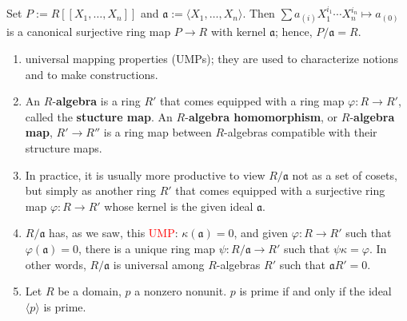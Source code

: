 \documentclass{ctexart}
\newcommand{\ideala}{\mathfrak{a}}
\begin{document}
Set $P:=R[[X_1,\dots,X_n]]$ and $\ideala:=\langle X_1,\dots,X_n\rangle$. Then $\sum a_{(i)}X_1^{i_1}\cdots X_n^{i_n}\mapsto a_{(0)}$ is a canonical surjective ring map $P\to R$ with kernel $\ideala$; hence, $P/\ideala=R$.

\begin{enumerate}
  \item universal mapping properties (UMPs); they are used to characterize notions and to make constructions.
  \item An $R$-\textbf{algebra} is a ring $R'$ that comes equipped with a ring map $\varphi : R \to R'$, called the \textbf{stucture map}. An $R$-\textbf{algebra homomorphism}, or $R$-\textbf{algebra map}, $R'\to R''$ is a ring map between $R$-algebras compatible with their structure maps.
  \item In practice, it is usually more productive to view $R/\ideala$ not as a set of cosets, but simply as another ring $R'$ that comes equipped with a surjective ring map $\varphi:R\to R'$ whose kernel is the given ideal $\ideala$.
  \item $R/\ideala$ has, as we saw, this \textcolor{red}{UMP}: $\kappa(\ideala) = 0$, and given $\varphi:R\to R'$ such that $\varphi(\ideala) = 0$, there is a unique ring map $\psi:R/\ideala\to R'$ such that $\psi\kappa=\varphi$. In other words, $R/\ideala$ is universal among $R$-algebras $R'$ such that $\ideala R'=0$.
  \item Let $R$ be a domain, $p$ a nonzero nonunit. $p$ is prime if and only if the ideal $\langle p\rangle$ is prime.
\end{enumerate}
\end{document}
